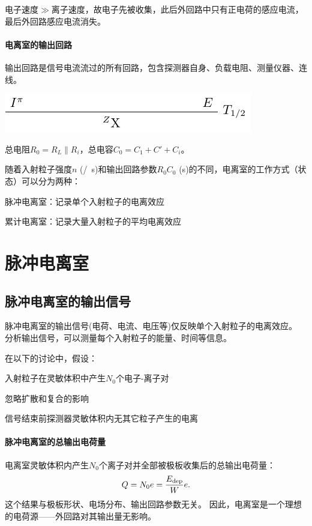 电子速度$\gg$离子速度，故电子先被收集，此后外回路中只有正电荷的感应电流，最后外回路感应电流消失。
\paragraph{电离室的输出回路}
输出回路是信号电流流过的所有回路，包含探测器自身、负载电阻、测量仪器、连线。
\begin{center}
	\includegraphics[page=15]{figures/tikz/layouts.pdf}
\end{center}
总电阻$R_0=R_L\parallel R_i$，总电容$C_0=C_1+C'+C_i$。

随着入射粒子强度$n$ (\si{/s})和输出回路参数$R_0C_0$ (s)的不同，电离室的工作方式（状态）可以分为两种：
\begin{compactitem}
	\item 脉冲电离室：记录单个入射粒子的电离效应
	\item 累计电离室：记录大量入射粒子的平均电离效应
\end{compactitem}

\section{脉冲电离室}

\subsection{脉冲电离室的输出信号}

脉冲电离室的输出信号(电荷、电流、电压等)仅反映单个入射粒子的电离效应。
分析输出信号，可以测量每个入射粒子的能量、时间等信息。

在以下的讨论中，假设：
\begin{compactenum}
	\item 入射粒子在灵敏体积中产生$N_0$个电子-离子对
	\item 忽略扩散和复合的影响
	\item 信号结束前探测器灵敏体积内无其它粒子产生的电离
\end{compactenum}
\paragraph{脉冲电离室的总输出电荷量}
电离室灵敏体积内产生$N_0$个离子对并全部被极板收集后的总输出电荷量：
\[
	Q=N_0e=\frac{E_{\mathrm{dep}}}We.
\]
这个结果与极板形状、电场分布、输出回路参数无关。
因此，电离室是一个理想的电荷源——外回路对其输出量无影响。
